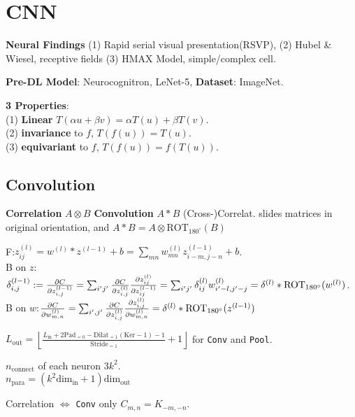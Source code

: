\section{CNN}

\textbf{Neural Findings}
(1) Rapid serial visual presentation(RSVP), (2) Hubel \& Wiesel, receptive fields (3) HMAX Model, simple/complex cell.

\textbf{Pre-DL Model}: Neurocognitron, LeNet-5, \textbf{Dataset}: ImageNet.

\textbf{3 Properties}:\\
(1) \textbf{Linear} \(T(\alpha {u}+\beta {v})=\alpha T({u})+\beta T({v})\).\\ (2) \textbf{invariance} to \(f\), \(T(f({u}))=T({u})\).\\ (3) \textbf{equivariant} to \(f\), \(T(f({u}))=f(T({u}))\).

\subsection*{Convolution}
\textbf{Correlation} $A \otimes B$  \textbf{Convolution} $A \ast B$
(Cross-)Correlat. slides matrices in original orientation, and $A \ast B = A \otimes \text{ROT}_{180^{\circ}}(B)$



\textsf{F}:\( z_{ij}^{(l)}=w^{(l)} * z^{(l-1)}+b= \sum_{mn} w_{mn}^{(l)} z_{i-m, j-n}^{(l-1)}+b\). \\
\textsf{B} on \(z\):\(\delta_{i,j}^{(l-1)} := \pdv{C}{z^{(l-1)}_{i,j}} = \sum_{i'j'} \pdv{C}{z^{(l)}_{i,j}} \pdv{z^{(l)}_{ij}}{z^{(l-1)}_{ij}} =  \sum_{i'j'} \delta_{ij}^{(l)} w_{i'-l,j'-j}^{(l)} = \delta^{(l)} * \text{ROT}_{180^{\circ}}(w^{(l)})\).\\
\textsf{B} on \(w\):\(\pdv{C}{w^{(l)}_{m,n}} =  \sum_{i',j'} \pdv{C}{z^{(l)}_{i,j}} \pdv{z^{(l)}_{i,j}}{w^{(l)}_{m,n}} =  \delta^{(l)} * \text{ROT}_{180^{\circ}}(z^{(l-1)})\)

\( L_{\text{out}}=\left\lfloor \frac{  L_{\text{in}} + 2\text{Pad}_{=0} - \text {Dilat}_{=1}(\text{Ker} - 1)-1 }{\text {Stride}_{=1}} + 1 \right\rfloor \) for \verb|Conv| and \verb|Pool|.

\(n_{\text{connect}}\) of each neuron \(3k^2\).\\
\(n_{\text{para}} = ( k^2 \text{dim}_{\text{in}} + 1)\text{dim}_{\text{out}}\)

Correlation \(\Leftrightarrow\) \verb|Conv| only \(C_{m,n} = K_{-m,-n}\).

